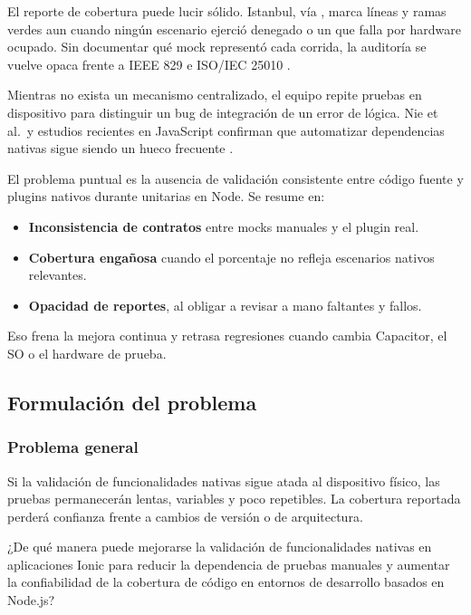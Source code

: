 El reporte de cobertura puede lucir sólido. Istanbul, vía , marca líneas y ramas verdes aun cuando ningún escenario ejerció  denegado o un  que falla por hardware ocupado. Sin documentar qué mock representó cada corrida, la auditoría se vuelve opaca frente a IEEE 829 e ISO/IEC 25010 \cite{ieee8292008,iso250102011}.

Mientras no exista un mecanismo centralizado, el equipo repite pruebas en dispositivo para distinguir un bug de integración de un error de lógica. Nie et al.\ y estudios recientes en JavaScript confirman que automatizar dependencias nativas sigue siendo un hueco frecuente \cite{nie2023gui_mobile_mapping,schafer2024testpilot}.

El problema puntual es la ausencia de validación consistente entre código fuente y plugins nativos durante unitarias en Node. Se resume en:
\begin{itemize}
    \item \textbf{Inconsistencia de contratos} entre mocks manuales y el plugin real.
    \item \textbf{Cobertura engañosa} cuando el porcentaje no refleja escenarios nativos relevantes.
    \item \textbf{Opacidad de reportes}, al obligar a revisar a mano faltantes y fallos.
\end{itemize}
Eso frena la mejora continua y retrasa regresiones cuando cambia Capacitor, el SO o el hardware de prueba.

\subsection{Formulación del problema}
\label{sec:formulacion_problema}

\subsubsection{Problema general}
\label{sec:problema_general}
Si la validación de funcionalidades nativas sigue atada al dispositivo físico, las pruebas permanecerán lentas, variables y poco repetibles. La cobertura reportada perderá confianza frente a cambios de versión o de arquitectura.

¿De qué manera puede mejorarse la validación de funcionalidades nativas en aplicaciones Ionic para reducir la dependencia de pruebas manuales y aumentar la confiabilidad de la cobertura de código en entornos de desarrollo basados en Node.js?

